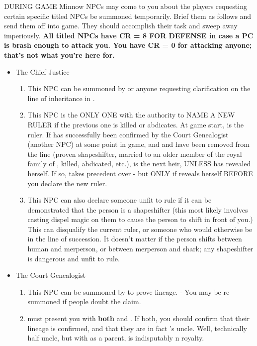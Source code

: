 \documentclass[green]{NeptuneBall}
\begin{document}
{\large DURING GAME}
Minnow NPCs may come to you about the players requesting certain specific titled NPCs be summoned temporarily. Brief them as follows and send them off into game. They should accomplish their task and sweep away imperiously. \textbf{All titled NPCs have CR = 8 FOR DEFENSE in case a PC is brash enough to attack you. You have CR = 0 for attacking anyone; that's not what you're here for.}
\begin{itemize}
	\item The Chief Justice
	\begin{enumerate}
		\item This NPC can be summoned by \cManta{} or anyone requesting clarification on the line of inheritance in \pAtlantis{}.
		\item This NPC is the ONLY ONE with the authority to NAME A NEW RULER if the previous one is killed or abdicates. At game start, \cKing{} is the ruler. If \cManta{} has successfully been confirmed by the Court Genealogist (another NPC) at some point in game, and \cKing{} and \cPrincess{} have been removed from the line (proven shapeshifter, married to an older member of the royal family of \pPacifica{}, killed, abdicated, etc.), \cManta{} is the next heir, UNLESS \cQueen{} has revealed herself. If so, \cQueen{} takes precedent over \cManta{} - but ONLY if \cQueen{\they} reveals herself BEFORE you declare \cManta{} the new ruler.
		\item This NPC can also declare someone unfit to rule if it can be demonstrated that the person is a shapeshifter (this most likely involves casting dispel magic on them to cause the person to shift in front of you.) This can disqualify the current ruler, or someone who would otherwise be in the line of succession. It doesn't matter if the person shifts between human and merperson, or between merperson and shark; any shapeshifter is dangerous and unfit to rule.
	\end{enumerate}
	\item The Court Genealogist
	\begin{enumerate}
		\item This NPC can be summoned by \cManta{} to prove \cManta{\their} lineage. - You may be re summoned if people doubt the claim.
		\item \cManta{} must present you with \textbf{both} \iBirthCertificate{} and \iJournal{}. If \cManta{\they} \cManta{\have} both, you should confirm that their lineage is confirmed, and that they are in fact \cKing{\full}'s uncle. Well, technically half uncle, but with \cExExKing{} as a parent, \cManta{} is indisputably \pAtlantis{}n royalty. 

\end{enumerate}
\end{itemize}
\end{document}
